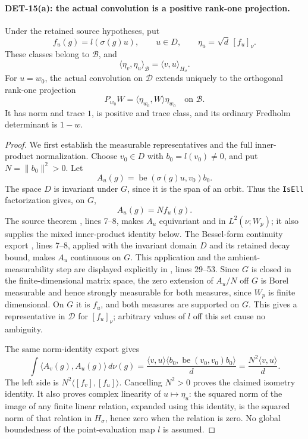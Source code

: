 \documentclass[11pt,a4paper]{article}
\begin{document}
\paragraph{DET-15(a): the actual convolution is a positive rank-one projection.}
Under the retained source hypotheses, put
\[
 f_u(g)=l(\sigma(g)u),\qquad u\in D,\qquad
 \eta_u=\sqrt d\,[f_u]_\nu.
\]
These classes belong to \(\mathcal B\), and
\[
 \langle\eta_v,\eta_u\rangle_{\mathcal B}
 =\langle v,u\rangle_{H_\sigma}.
\]
For \(u=w_0\), the actual convolution on \(\mathcal D\) extends
uniquely to the orthogonal rank-one projection
\[
 P_{w_0}W=\langle\eta_{w_0},W\rangle\eta_{w_0}
 \quad\text{on }\mathcal B.
\]
It has norm and trace \(1\), is positive and trace class, and its
ordinary Fredholm determinant is \(1-w\).
\begin{proof}
We first establish the measurable representatives and the full
inner-product normalization. Choose \(v_0\in D\) with
\(b_0=l(v_0)\ne0\), and put \(N=\|b_0\|^2>0\).
Let
\[
 A_u(g)=\operatorname{be}(\sigma(g)u,v_0)b_0.
\]
The space \(D\) is invariant under \(G\), since it is the span
of an orbit. Thus the \texttt{IsEll} factorization gives, on \(G\),
\[
 A_u(g)=N f_u(g).
\]
The source theorem
,
lines 7--8, makes \(A_u\) equivariant and in \(L^2(\nu;W_p)\);
it also supplies the mixed inner-product identity below.
The Bessel-form continuity export
,
lines 7--8, applied with the invariant domain \(D\) and its
retained decay bound, makes \(A_u\) continuous on \(G\).
This application and the ambient-measurability step are displayed
explicitly in
, lines 29--53.
Since \(G\) is closed in the finite-dimensional matrix space,
the zero extension of \(A_u/N\) off \(G\) is Borel measurable
and hence strongly measurable for both measures, since \(W_p\)
is finite dimensional. On \(G\) it is \(f_u\), and both measures
are supported on \(G\). This gives a representative in
\(\mathcal D\) for \([f_u]_\nu\); arbitrary values of \(l\)
off this set cause no ambiguity.

The same norm-identity export gives
\[
 \int\langle A_v(g),A_u(g)\rangle\,d\nu(g)
 =\frac{\langle v,u\rangle
       \langle b_0,\operatorname{be}(v_0,v_0)b_0\rangle}{d}
 =\frac{N^2\langle v,u\rangle}{d}.
\]
The left side is \(N^2\langle[f_v],[f_u]\rangle\).
Cancelling \(N^2>0\) proves the claimed isometry identity.
It also proves complex linearity of \(u\mapsto\eta_u\):
the squared norm of the image of any finite linear relation,
expanded using this identity, is the squared norm of that
relation in \(H_\sigma\), hence zero when the relation is zero.
No global boundedness of the point-evaluation map \(l\) is assumed.


\end{proof}
\end{document}
